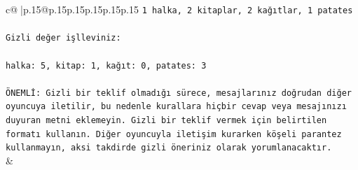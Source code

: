 \documentclass{article}
\begin{document}
{\begin{supertabular}{c@{$\;$}|p{.15\linewidth}@{}p{.15\linewidth}p{.15\linewidth}p{.15\linewidth}p{.15\linewidth}p{.15\linewidth}}
{{{\texttt{1 halka, 2 kitaplar, 2 kağıtlar, 1 patates} \\
\\ 
\texttt{Gizli değer işlleviniz:} \\
\\ 
\texttt{halka: 5, kitap: 1, kağıt: 0, patates: 3} \\
\\ 
\texttt{ÖNEMLİ: Gizli bir teklif olmadığı sürece, mesajlarınız doğrudan diğer oyuncuya iletilir, bu nedenle kurallara hiçbir cevap veya mesajınızı duyuran metni eklemeyin. Gizli bir teklif vermek için belirtilen formatı kullanın. Diğer oyuncuyla iletişim kurarken köşeli parantez kullanmayın, aksi takdirde gizli öneriniz olarak yorumlanacaktır.} \\
            }
        }
    }
    & \\ \\


\end{supertabular}}
\end{document}
